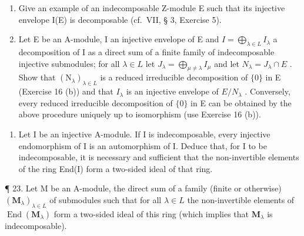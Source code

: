 \begin{enumerate}
\def\labelenumi{(\alph{enumi})}
\setcounter{enumi}{2}
\item
  Give an example of an indecomposable Z-module E such that its injective envelope I(E) is decomposable (cf.~VII, § 3, Exercise 5).
\item
  Let E be an A-module, I an injective envelope of E and \(I = \bigoplus_{\lambda \in L} I_{\lambda}\) a decomposition of I as a direct sum of a finite family of indecomposable injective submodules; for all \(\lambda \in L\) let \(J_{\lambda} = \bigoplus_{\mu \neq \lambda} I_{\mu}\) and let \(N_{\lambda} = J_{\lambda} \cap E\) . Show that \((\mathrm{N}_{\lambda})_{\lambda \in L}\) is a reduced irreducible decomposition of \(\{0\}\) in E (Exercise 16 (b)) and that \(I_{\lambda}\) is an injective envelope of \(E/N_{\lambda}\) . Conversely, every reduced irreducible decomposition of \(\{0\}\) in E can be obtained by the above procedure uniquely up to isomorphism (use Exercise 16 (b)).
\end{enumerate}

\begin{enumerate}
\def\labelenumi{\arabic{enumi}.}
\setcounter{enumi}{21}
\tightlist
\item
  Let I be an injective A-module. If I is indecomposable, every injective endomorphism of I is an automorphism of I. Deduce that, for I to be indecomposable, it is necessary and sufficient that the non-invertible elements of the ring End(I) form a two-sided ideal of that ring.
\end{enumerate}

¶ 23. Let M be an A-module, the direct sum of a family (finite or otherwise) \((\mathbf{M}_{\lambda})_{\lambda \in L}\) of submodules such that for all \(\lambda \in L\) the non-invertible elements of \(\operatorname{End}(\mathbf{M}_{\lambda})\) form a two-sided ideal of this ring (which implies that \(\mathbf{M}_{\lambda}\) is indecomposable).

